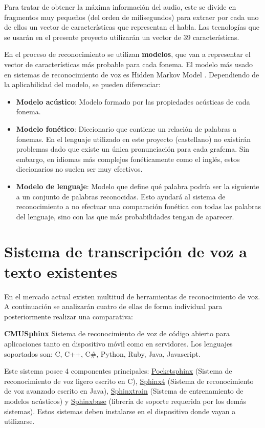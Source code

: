 \documentclass[../main.tex]{subfiles}
\begin{document}
Para tratar de obtener la máxima información del audio, este se divide en fragmentos muy pequeños (del orden de milisegundos) para extraer por cada uno de ellos un vector de características que representan el habla. Las tecnologías que se usarán en el presente proyecto utilizarán un vector de 39 características.

En el proceso de reconocimiento se utilizan \textbf{modelos}, que van a representar el vector de características más probable para cada \gls{fonema}. El modelo más usado en sistemas de reconocimiento de voz es Hidden Markov Model \cite{Fine1998}. Dependiendo de la aplicabilidad del modelo, se pueden diferenciar:
\begin{itemize}
    \item \textbf{Modelo acústico}: Modelo formado por las propiedades acústicas de cada fonema.
    \item \textbf{Modelo fonético}: Diccionario que contiene un relación de palabras a fonemas. En el lenguaje utilizado en este proyecto (castellano) no existirán problemas dado que existe un única pronunciación para cada \gls{grafema}. Sin embargo, en idiomas más complejos fonéticamente como el inglés, estos diccionarios no suelen ser muy efectivos.
    \item \textbf{Modelo de lenguaje}: Modelo que define qué palabra podría ser la siguiente a un conjunto de palabras reconocidas. Esto ayudará al sistema de reconocimiento a no efectuar una comparación fonética con todas las palabras del lenguaje, sino con las que más probabilidades tengan de aparecer.
\end{itemize}

\section{Sistema de transcripción de voz a texto existentes}\label{sec:sistemas_voz}
En el mercado actual existen multitud de herramientas de reconocimiento de voz. A continuación se analizarán cuatro de ellas de forma individual para posteriormente realizar una comparativa: 

\label{par:cmusphinx}\textbf{CMUSphinx} Sistema de reconocimiento de voz de código abierto para aplicaciones tanto en dispositivo móvil como en servidores. Los lenguajes soportados son: C, C++, C\#, Python, Ruby, Java, Javascript.\cite{Lamere2003}

Este sistema posee 4 componentes principales: \underline{Pocketsphinx} (Sistema de reconocimiento de voz ligero escrito en C), \underline{Sphinx4} (Sistema de reconocimiento de voz avanzado escrito en Java), \underline{Sphinxtrain} (Sistema de entrenamiento de modelos acústicos) y \underline{Sphinxbase} (librería de soporte requerida por los demás sistemas). Estos sistemas deben instalarse en el dispositivo donde vayan a utilizarse.
\end{document}
